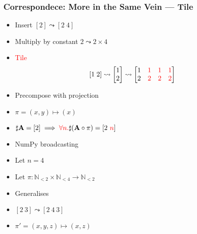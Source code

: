 \documentclass[xetex,mathserif,serif]{beamer}
\newcommand\mrm[1]{\mathrm{#1}}
\newcommand\brm[1]{\bm{\mrm{#1}}}
\newcommand\Nat{\mathbb{N}}
\newcommand\NB[1]{\textcolor{red}{#1}}
\begin{document}
\begin{frame}
  \frametitle{Correspondece: More in the Same Vein --- Tile}
  \begin{itemize}%
    \item Insert \([2] \leadsto [2\;4]\)
    \item Multiply by constant \(2\leadsto 2\times 4\)
    \item \NB{Tile} \[
      [1\;2]\leadsto
      \begin{bmatrix} 1 \\ 2 \end{bmatrix}\leadsto
      \begin{bmatrix} 1 & \NB 1 & \NB 1 & \NB  1 \\ 2 & \NB 2 & \NB 2 & \NB 2 \end{bmatrix}
    \]
    \item Precompose with projection
    \item \(\pi = (x, y) \mapsto (x)\)
    \item \(\sharp \brm A = [2] \implies \NB{\forall n.} \sharp(\brm A \circ \pi) = [2\ \NB n]\)
    \item NumPy broadcasting
    \item Let \(n = 4\)
    \item Let \(\pi : \Nat_{<2} \times \Nat_{<4} \to \Nat_{<2}\)
    \item Generalises
    \item \([2\ 3] \leadsto [2\ 4\ 3]\)
    \item \(\pi' = (x, y, z) \mapsto (x, z)\)
  \end{itemize}
\end{frame}
\end{document}
